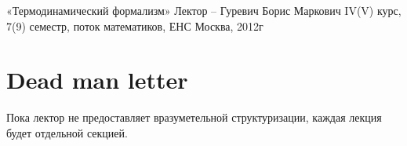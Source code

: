 \documentclass[10pt]{article}
\begin{document}
{«Термодинамический формализм»}
{Лектор -- Гуревич Борис Маркович}
{IV(V) курс, 7(9) семестр, поток математиков, ЕНС}
{Москва, 2012г}

\section*{Dead man letter}


Пока лектор не предоставляет  вразуметельной структуризации,
каждая лекция будет отдельной секцией.



%


\end{document}
